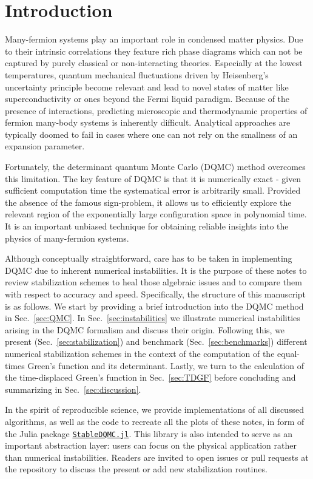\documentclass[submission, Phys]{SciPost}
\begin{document}
\section{Introduction}


Many-fermion systems play an important role in condensed matter physics. Due to their intrinsic correlations they feature rich phase diagrams which can not be captured by purely classical or non-interacting theories. Especially at the lowest temperatures, quantum mechanical fluctuations driven by Heisenberg's uncertainty principle become relevant and lead to novel states of matter like superconductivity or ones beyond the Fermi liquid paradigm. Because of the presence of interactions, predicting microscopic and thermodynamic properties of fermion many-body systems is inherently difficult. Analytical approaches are typically doomed to fail in cases where one can not rely on the smallness of an expansion parameter.

Fortunately, the determinant quantum Monte Carlo (DQMC) method overcomes this limitation. The key feature of DQMC is that it is numerically exact - given sufficient computation time the systematical error is arbitrarily small. Provided the absence of the famous sign-problem, it allows us to efficiently explore the relevant region of the exponentially large configuration space in polynomial time. It is an important unbiased technique for obtaining reliable insights into the physics of many-fermion systems.

Although conceptually straightforward, care has to be taken in implementing DQMC due to inherent numerical instabilities. It is the purpose of these notes to review stabilization schemes to heal those algebraic issues and to compare them with respect to accuracy and speed.
Specifically, the structure of this manuscript is as follows. We start by providing a brief introduction into the DQMC method in Sec.~\ref{sec:QMC}. In Sec.~\ref{sec:instabilities} we illustrate numerical instabilities arising in the DQMC formalism and discuss their origin. Following this, we present (Sec.~\ref{sec:stabilization}) and benchmark (Sec.~\ref{sec:benchmarks}) different numerical stabilization schemes in the context of the computation of the equal-times Green's function and its determinant. Lastly, we turn to the calculation of the time-displaced Green's function in Sec.~\ref{sec:TDGF} before concluding and summarizing in Sec.~\ref{sec:discussion}.

In the spirit of reproducible science, we provide implementations of all discussed algorithms, as well as the code to recreate all the plots of these notes, in form of the Julia package \href{http://github.com/crstnbr/StableDQMC.jl}{\texttt{StableDQMC.jl}}. This library is also intended to serve as an important abstraction layer: users can focus on the physical application rather than numerical instabilities. Readers are invited to open issues or pull requests at the repository to discuss the present or add new stabilization routines.
\end{document}
